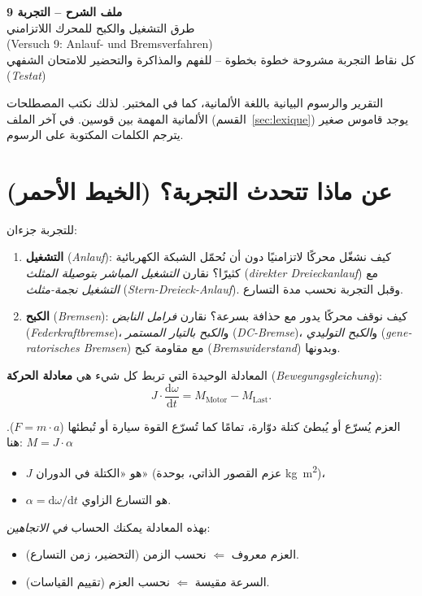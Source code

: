 \documentclass[11pt,a4paper]{article}
\newcommand{\de}[1]{(\textgerman{\itshape #1})}
\newcommand{\dt}[1]{\textgerman{#1}}
\begin{document}
\sloppy
\begin{center}
{\LARGE\bfseries ملف الشرح – التجربة 9}\\[4pt]
{\Large طرق التشغيل والكبح للمحرك اللاتزامني}\\[2pt]
{\normalsize\dt{(Versuch 9: Anlauf- und Bremsverfahren)}}\\[6pt]
{\normalsize كل نقاط التجربة مشروحة خطوة بخطوة – للفهم والمذاكرة والتحضير للامتحان الشفهي \de{Testat}}
\end{center}

\begin{achtung}
التقرير والرسوم البيانية باللغة الألمانية، كما في المختبر. لذلك نكتب المصطلحات الألمانية المهمة
بين قوسين. في آخر الملف (القسم~\ref{sec:lexique}) يوجد قاموس صغير يترجم الكلمات المكتوبة على الرسوم.
\end{achtung}

\tableofcontents
\newpage

\section{عن ماذا تتحدث التجربة؟ (الخيط الأحمر)}
للتجربة جزءان:
\begin{enumerate}
\item \textbf{التشغيل} \de{Anlauf}: كيف نشغّل محركًا لاتزامنيًا دون أن نُحمّل الشبكة الكهربائية كثيرًا؟
  نقارن \emph{التشغيل المباشر بتوصيلة المثلث} \de{direkter Dreieckanlauf}
  مع \emph{التشغيل نجمة-مثلث} \de{Stern-Dreieck-Anlauf}.
  وقبل التجربة نحسب مدة التسارع.
\item \textbf{الكبح} \de{Bremsen}: كيف نوقف محركًا يدور مع حذافة بسرعة؟
  نقارن \emph{فرامل النابض} \de{Federkraftbremse}، و\emph{الكبح بالتيار المستمر} \de{DC-Bremse}،
  و\emph{الكبح التوليدي} \de{generatorisches Bremsen} مع مقاومة كبح \de{Bremswiderstand} وبدونها.
\end{enumerate}
المعادلة الوحيدة التي تربط كل شيء هي \textbf{معادلة الحركة} \de{Bewegungsgleichung}:
\[
  J\cdot\frac{\mathrm d\omega}{\mathrm dt} = M_\mathrm{Motor} - M_\mathrm{Last}.
\]
\begin{einfach}
العزم يُسرّع أو يُبطئ كتلة دوّارة، تمامًا كما تُسرّع القوة سيارة أو تُبطئها ($F = m\cdot a$).
هنا: $M = J\cdot\alpha$
\begin{itemize}
\item $J$ هو «الكتلة في الدوران» (عزم القصور الذاتي، بوحدة \si{kg.m^2})،
\item $\alpha = \mathrm d\omega/\mathrm dt$ هو التسارع الزاوي.
\end{itemize}
بهذه المعادلة يمكنك الحساب \emph{في الاتجاهين}:
\begin{itemize}
\item العزم معروف $\Leftarrow$ نحسب الزمن (التحضير، زمن التسارع).
\item السرعة مقيسة $\Leftarrow$ نحسب العزم (تقييم القياسات).
\end{itemize}
\end{einfach}
\end{document}
